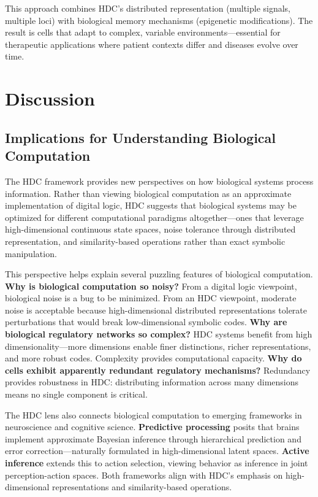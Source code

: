 \documentclass[12pt]{article}
\begin{document}
This approach combines HDC's distributed representation (multiple signals, multiple loci) with biological memory mechanisms (epigenetic modifications). The result is cells that adapt to complex, variable environments—essential for therapeutic applications where patient contexts differ and diseases evolve over time.

\section{Discussion}

\subsection{Implications for Understanding Biological Computation}

The HDC framework provides new perspectives on how biological systems process information. Rather than viewing biological computation as an approximate implementation of digital logic, HDC suggests that biological systems may be optimized for different computational paradigms altogether—ones that leverage high-dimensional continuous state spaces, noise tolerance through distributed representation, and similarity-based operations rather than exact symbolic manipulation.

This perspective helps explain several puzzling features of biological computation. \textbf{Why is biological computation so noisy?} From a digital logic viewpoint, biological noise is a bug to be minimized. From an HDC viewpoint, moderate noise is acceptable because high-dimensional distributed representations tolerate perturbations that would break low-dimensional symbolic codes. \textbf{Why are biological regulatory networks so complex?} HDC systems benefit from high dimensionality—more dimensions enable finer distinctions, richer representations, and more robust codes. Complexity provides computational capacity. \textbf{Why do cells exhibit apparently redundant regulatory mechanisms?} Redundancy provides robustness in HDC: distributing information across many dimensions means no single component is critical.

The HDC lens also connects biological computation to emerging frameworks in neuroscience and cognitive science. \textbf{Predictive processing} posits that brains implement approximate Bayesian inference through hierarchical prediction and error correction—naturally formulated in high-dimensional latent spaces. \textbf{Active inference} extends this to action selection, viewing behavior as inference in joint perception-action spaces. Both frameworks align with HDC's emphasis on high-dimensional representations and similarity-based operations.
\end{document}
